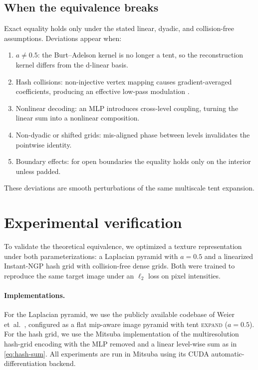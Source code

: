 \documentclass[a4paper,11pt,oneside]{article}
\numberwithin{equation}{section}
\begin{document}
\subsection{When the equivalence breaks}
Exact equality holds only under the stated linear, dyadic,
and collision-free assumptions.  Deviations appear when:
\begin{enumerate}
\item $a\neq0.5$: the Burt–Adelson kernel is no longer a tent, so
  the reconstruction kernel differs from the d-linear basis.
\item Hash collisions: non-injective vertex mapping causes
  gradient-averaged coefficients, producing an effective
  low-pass modulation \cite{mueller2022instant}.
\item Nonlinear decoding: an MLP introduces cross-level coupling,
  turning the linear sum into a nonlinear composition.
\item Non-dyadic or shifted grids: mis-aligned phase
  between levels invalidates the pointwise identity.
\item Boundary effects: for open boundaries the equality holds
  only on the interior unless padded.
\end{enumerate}
These deviations are smooth perturbations of the same
multiscale tent expansion.

\section{Experimental verification}

To validate the theoretical equivalence, we optimized a texture
representation under both parameterizations: a Laplacian pyramid with
$a=0.5$ and a linearized Instant-NGP hash grid with collision-free
dense grids.  Both were trained to reproduce the same target image
under an $\ell_2$ loss on pixel intensities.

\paragraph{Implementations.}
For the Laplacian pyramid, we use the publicly available codebase of
Weier et~al.\ \cite{Weier2025PracticalInverse}, configured as a flat
mip-aware image pyramid with tent \textsc{expand} ($a{=}0.5$).
For the hash grid, we use the Mitsuba implementation of the
multiresolution hash-grid encoding with the MLP
removed and a linear level-wise sum as in \cref{eq:hash-sum}.
All experiments are run in Mitsuba using its CUDA
automatic-differentiation backend.
\end{document}
